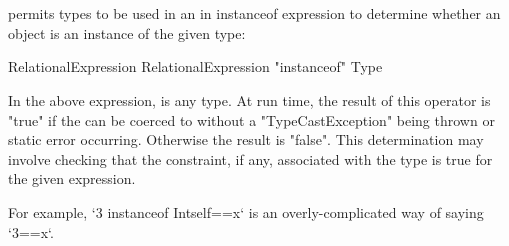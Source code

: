 






\section{}
\label{instanceOf}

\Xten{} permits types to be used in an in instanceof expression
to determine whether an object is an instance of the given type:

\begin{grammar}
RelationalExpression \: RelationalExpression \xcd"instanceof" Type
\end{grammar}

In the above expression,  is any type. At run time, the
result of this operator is \xcd"true" if the
 can be coerced to 
without a \xcd"TypeCastException" being thrown or static error occurring.
Otherwise the result is \xcd"false". This determination may involve checking
that the constraint, if any, associated with the type is true for the given
expression.

For example, \xcd`3 instanceof Int{self==x}` is an overly-complicated way of
saying \xcd`3==x`.


